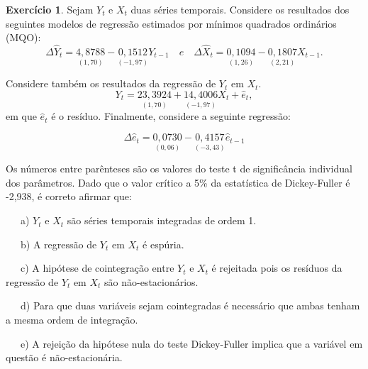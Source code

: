 \documentclass[
]{book}
\theoremstyle{definition}
\theoremstyle{definition}
\theoremstyle{definition}
\newtheorem{exercise}{Exercício}[chapter]
\theoremstyle{remark}
\begin{document}
\begin{exercise}
\protect\hypertarget{exr:exervf6}{}{\label{exr:exervf6} }Sejam \(Y_t\) e \(X_t\) duas séries temporais. Considere os resultados dos seguintes modelos de regressão estimados por mínimos quadrados ordinários (MQO):
\begin{equation*}
    \Delta\hat{Y}_t=\underset{(1,70)}{4,8788}-\underset{(-1,97)}{0,1512}Y_{t-1}\,\,\,\,\,\,e\,\,\,\,\,\,
 \Delta\hat{X}_t=\underset{(1,26)}{0,1094}-\underset{(2,21)}{0,1807}X_{t-1}.
\end{equation*}

Considere também os resultados da regressão de \(Y_t\) em \(X_t\).
\begin{equation*}
    {Y}_t=\underset{(1,70)}{23,3924}+\underset{(-1,97)}{14,4006}X_{t}+\hat{e}_t,
\end{equation*}
em que \(\hat{e}_t\) é o resíduo. Finalmente, considere a seguinte
regressão:

\begin{equation*}
    \Delta\hat{e}_t=\underset{(0,06)}{0,0730}-\underset{(-3,43)}{0,4157}\hat{e}_{t-1}
\end{equation*}

Os números entre parênteses são os valores do teste t de significância individual dos parâmetros. Dado que o valor crítico a 5\% da estatística de Dickey-Fuller é -2,938, é correto afirmar que:

~~~a) \(Y_t\) e \(X_t\) são séries temporais integradas de ordem 1.

~~~b) A regressão de \(Y_t\) em \(X_t\) é espúria.

~~~c) A hipótese de cointegração entre \(Y_t\) e \(X_t\) é rejeitada pois os resíduos da regressão de \(Y_t\) em \(X_t\) são não-estacionários.

~~~d) Para que duas variáveis sejam cointegradas é necessário que ambas tenham a mesma ordem de integração.

~~~e) A rejeição da hipótese nula do teste Dickey-Fuller implica que a variável em questão é não-estacionária.
\end{exercise}
\end{document}
